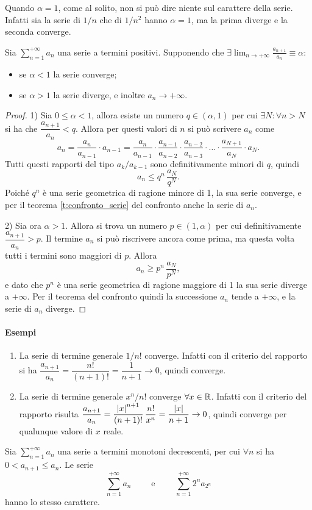Quando $\alpha=1$, come al solito, non si può dire niente sul carattere della serie. Infatti sia la serie di $1/n$ che di $1/n^2$ hanno $\alpha=1$, ma la prima diverge e la seconda converge.
\begin{teorema}
\label{t:criterio_rapporto_serie}
Sia $\sum_{n=1}^{+\infty}a_n$ una serie a termini positivi. Supponendo che $\exists\lim_{n\to+\infty}\frac{a_{n+1}}{a_n}\equiv\alpha$:
\begin{itemize}
\item se $\alpha<1$ la serie converge;
\item se $\alpha>1$ la serie diverge, e inoltre $a_n\to+\infty$.
\end{itemize}
\end{teorema}
\begin{proof}
1) Sia $0\leq\alpha<1$, allora esiste un numero $q\in(\alpha,1)$ per cui $\exists N\colon\forall n>N$ si ha che $\dfrac{a_{n+1}}{a_n}<q$. Allora per questi valori di $n$ si può scrivere $a_n$ come
\[
a_n=\frac{a_n}{a_{n-1}}\cdot a_{n-1}=\frac{a_n}{a_{n-1}}\cdot\frac{a_{n-1}}{a_{n-2}}\cdot\frac{a_{n-2}}{a_{n-3}}\cdot\dots\cdot\frac{a_{N+1}}{a_N}\cdot a_N.
\]
Tutti questi rapporti del tipo $a_k/a_{k-1}$ sono definitivamente minori di $q$, quindi
\[
a_n\leq q^n\,\frac{a_N}{q^N}.
\]
Poiché $q^n$ è una serie geometrica di ragione minore di 1, la sua serie converge, e per il teorema \ref{t:confronto_serie} del confronto anche la serie di $a_n$.

2) Sia ora $\alpha>1$. Allora si trova un numero $p\in(1,\alpha)$ per cui definitivamente $\dfrac{a_{n+1}}{a_n}>p$. Il termine $a_n$ si può riscrivere ancora come prima, ma questa volta tutti i termini sono maggiori di $p$. Allora
\[
a_n\geq p^n\,\frac{a_N}{p^N},
\]
e dato che $p^n$ è una serie geometrica di ragione maggiore di 1 la sua serie diverge a $+\infty$. Per il teorema del confronto quindi la successione $a_n$ tende a $+\infty$, e la serie di $a_n$ diverge.
\end{proof}
\paragraph{Esempi}
\begin{enumerate}
\item La serie di termine generale $1/n!$ converge. Infatti con il criterio del rapporto si ha $\dfrac{a_{n+1}}{a_n}=\dfrac{n!}{(n+1)!}=\dfrac1{n+1}\to 0$, quindi converge.
\item La serie di termine generale $x^n/n!$ converge $\forall x\in\mathbb{R}$. Infatti con il criterio del rapporto risulta $\dfrac{a_{n+1}}{a_n}=\dfrac{\left|{x}\right|^{n+1}}{(n+1)!}\,\dfrac{n!}{x^n}=\dfrac{\left|{x}\right|}{n+1}\to 0$, quindi converge per qualunque valore di $x$ reale.
\end{enumerate}
\begin{teorema}
Sia $\sum_{n=1}^{+\infty}a_n$ una serie a termini monotoni decrescenti, per cui $\forall n$ si ha $0<a_{n+1}\leq a_n$. Le serie
\[
\sum_{n=1}^{+\infty}a_n\qquad\text{ e }\qquad\sum_{n=1}^{+\infty}2^na_{2^n}
\]
hanno lo stesso carattere.
\end{teorema}
